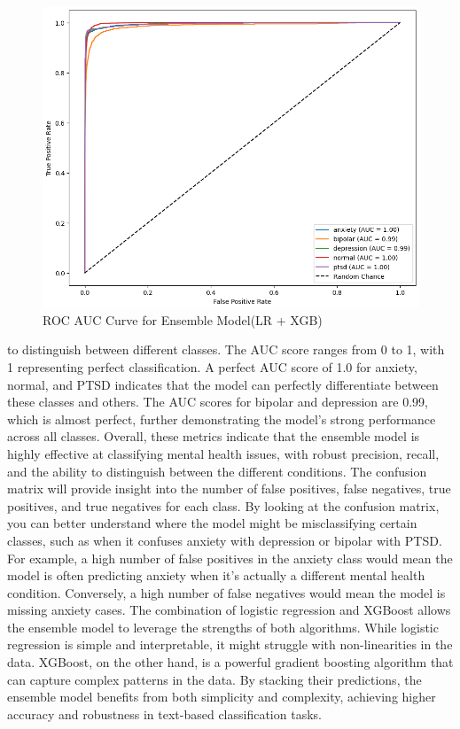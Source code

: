 \begin{figure}[h!]  
    \centering
    \includegraphics[width=1.0\textwidth]{Images/EM ROC.png}  
    \caption{ROC AUC Curve for Ensemble Model(LR + XGB)}
    \label{dfdl12443}  %
\end{figure}

\noindent
to distinguish between different classes. The AUC score ranges from 0 to 1, with 1 representing perfect classification. A perfect AUC score of 1.0 for anxiety, normal, and PTSD indicates that the model can perfectly differentiate between these classes and others. The AUC scores for bipolar and depression are 0.99, which is almost perfect, further demonstrating the model's strong performance across all classes. Overall, these metrics indicate that the ensemble model is highly effective at classifying mental health issues, with robust precision, recall, and the ability to distinguish between the different conditions. The confusion matrix will provide insight into the number of false positives, false negatives, true positives, and true negatives for each class. By looking at the confusion matrix, you can better understand where the model might be misclassifying certain classes, such as when it confuses anxiety with depression or bipolar with PTSD. For example, a high number of false positives in the anxiety class would mean the model is often predicting anxiety when it's actually a different mental health condition. Conversely, a high number of false negatives would mean the model is missing anxiety cases. The combination of logistic regression and XGBoost allows the ensemble model to leverage the strengths of both algorithms. While logistic regression is simple and interpretable, it might struggle with non-linearities in the data. XGBoost, on the other hand, is a powerful gradient boosting algorithm that can capture complex patterns in the data. By stacking their predictions, the ensemble model benefits from both simplicity and complexity, achieving higher accuracy and robustness in text-based classification tasks.

